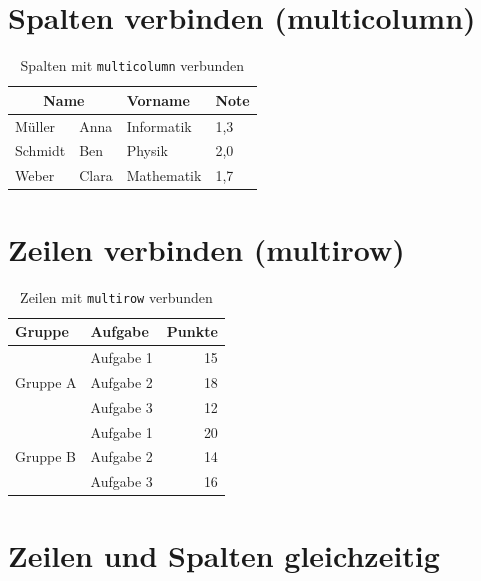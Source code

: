 \section{Spalten verbinden (multicolumn)}

\begin{table}[htbp]
    \centering
    \caption{Spalten mit \texttt{multicolumn} verbunden}
    \label{tab:multicolumn}
    \begin{tabular}{llll}
        \toprule
        \multicolumn{2}{c}{Name} & Vorname & Note \\
        \midrule
        Müller & Anna & Informatik & 1{,}3 \\
        Schmidt & Ben & Physik & 2{,}0 \\
        Weber & Clara & Mathematik & 1{,}7 \\
        \bottomrule
    \end{tabular}
\end{table}

\section{Zeilen verbinden (multirow)}

\begin{table}[htbp]
    \centering
    \caption{Zeilen mit \texttt{multirow} verbunden}
    \label{tab:multirow}
    \begin{tabular}{llr}
        \toprule
        Gruppe & Aufgabe & Punkte \\
        \midrule
        \multirow{3}{*}{Gruppe A}
            & Aufgabe 1 & 15 \\
            & Aufgabe 2 & 18 \\
            & Aufgabe 3 & 12 \\
        \midrule
        \multirow{3}{*}{Gruppe B}
            & Aufgabe 1 & 20 \\
            & Aufgabe 2 & 14 \\
            & Aufgabe 3 & 16 \\
        \bottomrule
    \end{tabular}
\end{table}

\section{Zeilen und Spalten gleichzeitig}

